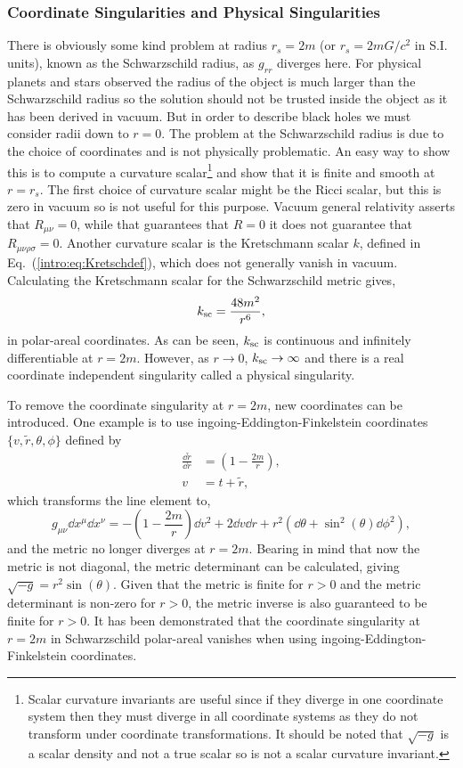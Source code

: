 \subsubsection{Coordinate Singularities and Physical Singularities}
There is obviously some kind problem at radius $r_s=2m$ (or $r_s=2mG/c^2$ in S.I. units), known as the Schwarzschild radius, as $g_{rr}$ diverges here. For physical planets and stars observed the radius of the object is much larger than the Schwarzschild radius so the solution should not be trusted inside the object as it has been derived in vacuum. But in order to describe black holes we must consider radii down to $r=0$. The problem at the Schwarzschild radius is due to the choice of coordinates and is not physically problematic. An easy way to show this is to compute a curvature scalar\footnote{Scalar curvature invariants are useful since if they diverge in one coordinate system then they must diverge in all coordinate systems as they do not transform under coordinate transformations. It should be noted that $\sqrt{-g}$ is a scalar density and not a true scalar so is not a scalar curvature invariant.} and show that it is finite and smooth at $r=r_s$. The first choice of curvature scalar might be the Ricci scalar, but this is zero in vacuum so is not useful for this purpose. Vacuum general relativity asserts that $R_{\mu\nu}=0$, while that guarantees that $R=0$ it does not guarantee that $R_{\mu\nu\rho\sigma}=0$. Another curvature scalar is the Kretschmann scalar $k$, defined in Eq.~(\ref{intro:eq:Kretschdef}), which does not generally vanish in vacuum. Calculating the Kretschmann scalar for the Schwarzschild metric gives,
\begin{equation}
k_{\rm sc} = \frac{48 m^2}{r^6}, \label{intro:eq:Kretsch}
\end{equation}
in polar-areal coordinates. As can be seen, $k_{\rm sc}$ is continuous and infinitely differentiable at $r=2m$. However, as $r\rightarrow0$, $k_{\rm sc}\rightarrow \infty$ and there is a real coordinate independent singularity called a physical singularity.

To remove the coordinate singularity at $r=2m$, new coordinates can be introduced. One example is to use ingoing-Eddington-Finkelstein coordinates $\{ v,\tilde{r},\theta,\phi \}$ defined by
\begin{align}
\frac{\dd \tilde{r}}{\dd r} &= \left(1-\frac{2m}{r}\right), \\
v &= t + \tilde{r},
\end{align}
which transforms the line element to,
\begin{equation}
g_{\mu\nu}\dd x^\mu \dd x^\nu = -\left( 1-\frac{2m}{r}\right) \dd v^2 + 2 \dd v \dd r + r^2 \left(\dd \theta + \sin^2(\theta) \dd \phi^2\right),
\end{equation}
and the metric no longer diverges at $r=2m$. Bearing in mind that now the metric is not diagonal, the metric determinant can be calculated, giving $\sqrt{-g} = r^2 \sin(\theta)$. Given that the metric is finite for $r>0$ and the metric determinant is non-zero for $r>0$, the metric inverse is also guaranteed to be finite for $r>0$. It has been demonstrated that the coordinate singularity at $r=2m$ in Schwarzschild polar-areal vanishes when using ingoing-Eddington-Finkelstein coordinates.


